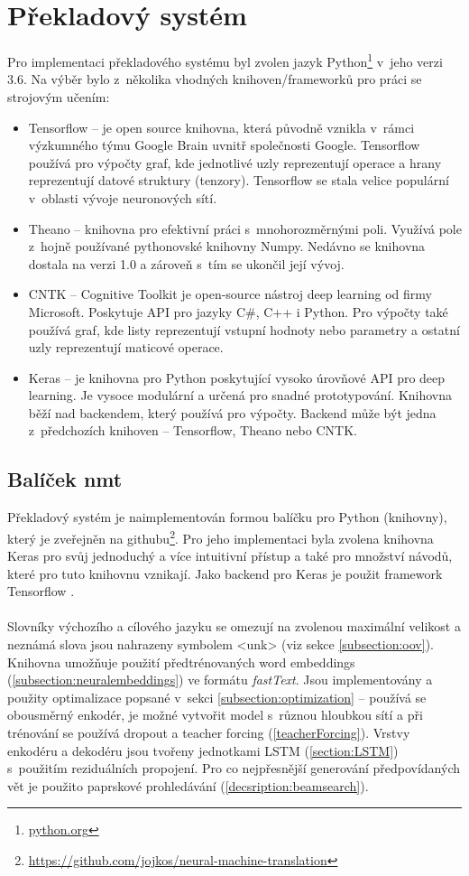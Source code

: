 \section{Překladový systém}\label{section:nmtSystem}
Pro implementaci překladového systému byl zvolen jazyk Python\footnote{\url{python.org}} v~jeho verzi 3.6. Na výběr bylo z~několika vhodných knihoven/frameworků pro práci se strojovým učením:

\begin{itemize}
  \item Tensorflow -- je open source knihovna, která původně vznikla v~rámci výzkumného týmu Google Brain uvnitř společnosti Google. Tensorflow používá pro výpočty graf, kde jednotlivé uzly reprezentují operace a hrany reprezentují datové struktury (tenzory). Tensorflow se stala velice populární v~oblasti vývoje neuronových sítí.
  \item Theano -- knihovna pro efektivní práci s~mnohorozměrnými poli. Využívá pole z~hojně používané pythonovské knihovny Numpy. Nedávno se knihovna dostala na verzi 1.0 a zároveň s~tím se ukončil její vývoj.
  \item CNTK -- Cognitive Toolkit je open-source nástroj deep learning od firmy Microsoft. Poskytuje API pro jazyky C\#, C++ i Python. Pro výpočty také používá graf, kde listy reprezentují vstupní hodnoty nebo parametry a ostatní uzly reprezentují maticové operace.
  \item Keras -- je knihovna pro Python poskytující vysoko úrovňové API pro deep learning. Je vysoce modulární a určená pro snadné prototypování. Knihovna běží nad backendem, který používá pro výpočty. Backend může být jedna z~předchozích knihoven -- Tensorflow, Theano nebo CNTK.
\end{itemize}


\subsection{Balíček nmt}
Překladový systém je naimplementován formou balíčku pro Python (knihovny), který je zveřejněn na githubu\footnote{\url{https://github.com/jojkos/neural-machine-translation}}. Pro jeho implementaci byla zvolena knihovna Keras \cite{keras} pro svůj jednoduchý a více intuitivní přístup a také pro množství návodů, které pro tuto knihovnu vznikají. Jako backend pro Keras je použit framework Tensorflow \cite{tensorflow}.
\\\\
Slovníky výchozího a cílového jazyku se omezují na zvolenou maximální velikost a neznámá slova jsou nahrazeny symbolem <unk> (viz sekce \ref{subsection:oov}). Knihovna umožňuje použití předtrénovaných word embeddings (\ref{subsection:neuralembeddings}) ve formátu \emph{fastText}. Jsou implementovány a použity optimalizace popsané v~sekci \ref{subsection:optimization} -- používá se obousměrný enkodér, je možné vytvořit model s~různou hloubkou sítí a při trénování se používá dropout a teacher forcing (\ref{teacherForcing}). Vrstvy enkodéru a dekodéru jsou tvořeny jednotkami LSTM (\ref{section:LSTM}) s~použitím reziduálních propojení. Pro co nejpřesnější generování předpovídaných vět je použito paprskové prohledávání (\ref{decsription:beamsearch}).


